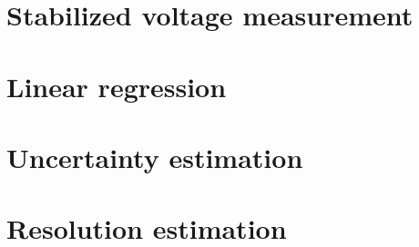 \documentclass[12pt]{article}
\begin{document}
\section{Stabilized voltage measurement} \label{sec:stabilized_signal}

\section{Linear regression} \label{sec:lin_regression}

\section{Uncertainty estimation} \label{sec:uncertainty}

\section{Resolution estimation} \label{sec:resolution}



\end{document}
